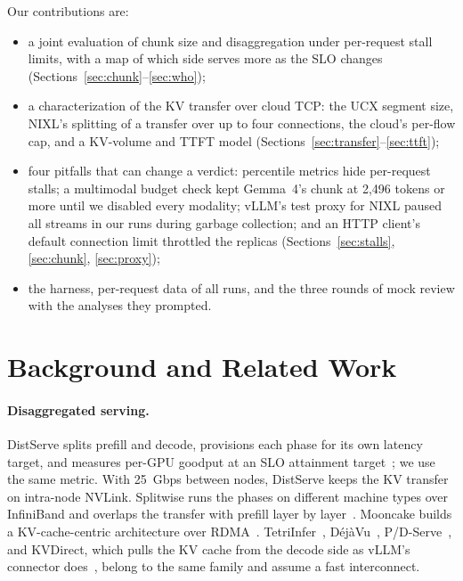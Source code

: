 \documentclass[11pt]{article}
\begin{document}
Our contributions are:
\begin{itemize}
  \item a joint evaluation of chunk size and disaggregation under per-request stall limits, with a map of which side serves more as the SLO changes (Sections~\ref{sec:chunk}--\ref{sec:who});
  \item a characterization of the KV transfer over cloud TCP: the UCX segment size, NIXL's splitting of a transfer over up to four connections, the cloud's per-flow cap, and a KV-volume and TTFT model (Sections~\ref{sec:transfer}--\ref{sec:ttft});
  \item four pitfalls that can change a verdict: percentile metrics hide per-request stalls; a multimodal budget check kept Gemma~4's chunk at 2,496 tokens or more until we disabled every modality; vLLM's test proxy for NIXL paused all streams in our runs during garbage collection; and an HTTP client's default connection limit throttled the replicas (Sections~\ref{sec:stalls}, \ref{sec:chunk}, \ref{sec:proxy});
  \item the harness, per-request data of all runs, and the three rounds of mock review with the analyses they prompted.
\end{itemize}

\section{Background and Related Work}

\paragraph{Disaggregated serving.} DistServe splits prefill and decode, provisions each phase for its own latency target, and measures per-GPU goodput at an SLO attainment target~\cite{distserve}; we use the same metric. With 25~Gbps between nodes, DistServe keeps the KV transfer on intra-node NVLink. Splitwise runs the phases on different machine types over InfiniBand and overlaps the transfer with prefill layer by layer~\cite{splitwise}. Mooncake builds a KV-cache-centric architecture over RDMA~\cite{mooncake}. TetriInfer~\cite{tetriinfer}, D\'ej\`aVu~\cite{dejavu}, P/D-Serve~\cite{pdserve}, and KVDirect, which pulls the KV cache from the decode side as vLLM's connector does~\cite{kvdirect}, belong to the same family and assume a fast interconnect.
\end{document}
